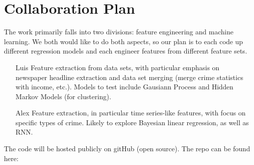 \documentclass[10pt]{article}
\begin{document}
\section{Collaboration Plan}
The work primarily falls into two divisions: feature engineering and machine learning. We both would like to do both aspects, so our plan is to each code up different regression models and each engineer features from different feature sets. 

\begin{itemize}
\item[Luis] Feature extraction from data sets, with particular emphasis on newspaper headline extraction and data set merging (merge crime statistics with income, etc.). Models to test include Gausiann Process and Hidden Markov Models (for clustering).
\item[Alex] Feature extraction, in particular time series-like features, with focus on specific types of crime. Likely to explore Bayesian linear regression, as well as RNN.
\end{itemize}
The code will be hosted publicly on gitHub (open source). The repo can be found here: 
\end{document}
